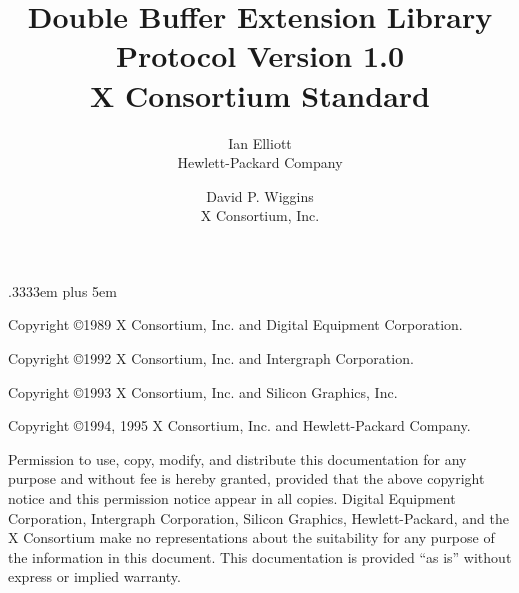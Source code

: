 \newenvironment{etypedef}[1]{\begin{keeptogether} \typename{#1} \begin{tabbing} \etabstops }{\end{tabbing} \end{keeptogether}}

\newcommand{\cfunctionname}[1]{\mbox{\tt #1}}
\newcommand{\cfunctiondecl}[1]{\mbox{\rm #1}}
\newcommand{\cargdecl}[2]{\penalty -1\typename{#1} \argname{#2}}
\newenvironment{cfunction}[2]{\begin{sloppypar}\begin{keeptogether}\vspace{5mm}\typename{#1}\\ \cfunctiondecl{#2}\ (}{)\end{keeptogether}\end{sloppypar}{\hangafter=2 \hangindent=20pt \raggedright\par}}

\spaceskip .3333em plus 5em



\title{Double Buffer Extension Library\\Protocol Version 1.0\\X Consortium Standard}
\author{Ian Elliott\\Hewlett-Packard Company \and David P. Wiggins\\X Consortium, Inc.}
\maketitle
\thispagestyle{empty}

\eject

Copyright \copyright 1989 X Consortium, Inc. and Digital Equipment Corporation.

Copyright \copyright 1992 X Consortium, Inc. and Intergraph Corporation.

Copyright \copyright 1993 X Consortium, Inc. and Silicon Graphics, Inc.

Copyright \copyright 1994, 1995 X Consortium, Inc. and Hewlett-Packard Company.

Permission to use, copy, modify, and distribute this documentation for
any purpose and without fee is hereby granted, provided that the above
copyright notice and this permission notice appear in all copies.
Digital Equipment Corporation, Intergraph Corporation, Silicon
Graphics, Hewlett-Packard, and the X Consortium make no
representations about the suitability for any purpose of the
information in this document.  This documentation is provided ``as is''
without express or implied warranty.

